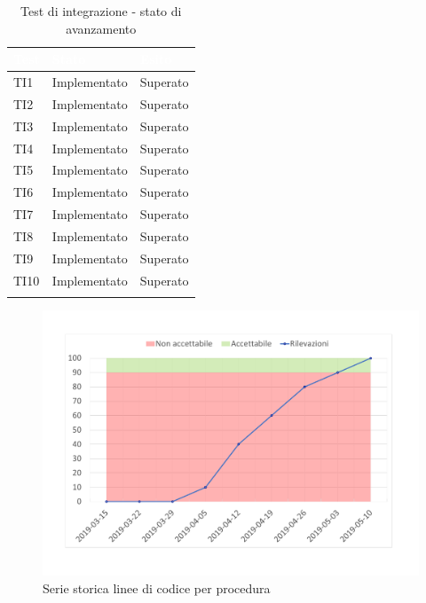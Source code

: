 	\begin{longtable}{|>{\centering\arraybackslash}m{1.6cm}|>{\centering\arraybackslash}m{6.41cm}|>{\centering\arraybackslash}m{3.1cm}|}		
	\rowcolor{LightBlue}
	\textbf{\textcolor{white}{Test}}
	& \textbf{\textcolor{white}{Stato}}
	& \textbf{\textcolor{white}{Esito}}\\
	\hline
	TI1
	& Implementato & Superato
	\\ \hline
	\rowcolor{LightGray}
	TI2
	& Implementato & Superato
	\\ \hline
	TI3
	& Implementato & Superato
	\\ \hline
	\rowcolor{LightGray}
	TI4
	& Implementato & Superato
	\\ \hline
	TI5
	& Implementato & Superato
	\\ \hline
	\rowcolor{LightGray}
	TI6
	& Implementato & Superato
	\\ \hline	
	TI7
	& Implementato & Superato
	\\ \hline	
	\rowcolor{LightGray}
	TI8
	& Implementato & Superato
	\\ \hline	
	TI9
	& Implementato & Superato
	\\ \hline	
	\rowcolor{LightGray}
	TI10
	& Implementato & Superato
	\\ \hline	
	\caption{Test di integrazione - stato di avanzamento}
\end{longtable}

\begin{figure}[H]
	\centering
	\includegraphics[scale=0.6]{images/resoconto/MPC4Chart.pdf}
	\caption{Serie storica linee di codice per procedura}	
\end{figure}

